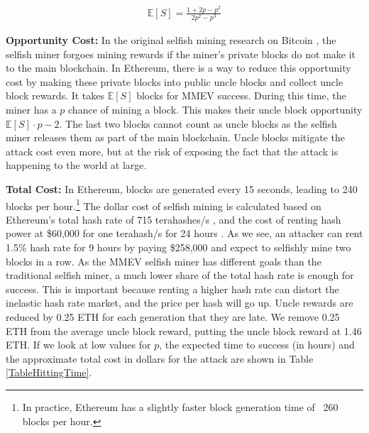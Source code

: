 \begin{align*}
    \mathbb{E}[S] = \frac{1 + 2p - p^2}{2p^2 - p^3}
\end{align*}

\noindent
\textbf{Opportunity Cost:} In the original selfish mining research on Bitcoin \cite{eyal2014majority}, the selfish miner forgoes mining rewards if the miner's private blocks do not make it to the main blockchain. In Ethereum, there is a way to reduce this opportunity cost by making these private blocks into public uncle blocks and collect uncle block rewards. It takes $\mathbb{E}[S]$ blocks for MMEV success. During this time, the miner has a $p$ chance of mining a block. This makes their uncle block opportunity $\mathbb{E}[S] \cdot p - 2$. The last two blocks cannot count as uncle blocks as the selfish miner releases them as part of the main blockchain. Uncle blocks mitigate the attack cost even more, but at the risk of exposing the fact that the attack is happening to the world at large.

\textbf{Total Cost:} In Ethereum, blocks are generated every 15 seconds, leading to 240 blocks per hour.\footnote{In practice, Ethereum has a slightly faster block generation time of ~260 blocks per hour.} The dollar cost of selfish mining is calculated based on Ethereum's total hash rate of 715 terahashes/s \cite{ethereum_hash_rate}, and the cost of renting hash power at \$60,000 for one terahash/s for 24 hours \cite{nicehash}. As we see, an attacker can rent 1.5\% hash rate for 9 hours by paying \$258,000 and expect to selfishly mine two blocks in a row. As the MMEV selfish miner has different goals than the traditional selfish miner, a much lower share of the total hash rate is enough for success. This is important because renting a higher hash rate can distort the inelastic hash rate market, and the price per hash will go up. Uncle rewards are reduced by 0.25 ETH for each generation that they are late. We remove 0.25 ETH from the average uncle block reward, putting the uncle block reward at 1.46 ETH. If we look at low values for $p$, the expected time to success (in hours) and the approximate total cost in dollars for the attack are shown in Table \ref{TableHittingTime}.
\break

